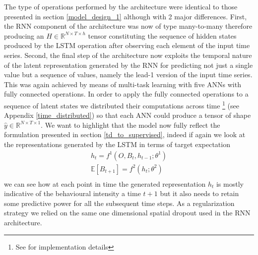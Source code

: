 The type of operations performed by the architecture were identical to those presented in section \ref{model_design_1} although with 2 major differences. First, the RNN component of the architecture was now of type many-to-many therefore producing an $H \in \mathbb{R}^{N \times T \times h}$ tensor constituting the sequence of hidden states produced by the LSTM operation after observing each element of the input time series\cite{bengio2017deep}. Second, the final step of the architecture now exploits the temporal nature of the latent representation generated by the RNN for predicting not just a single value but a sequence of values, namely the lead-1 version of the input time series. This was again achieved by means of multi-task learning with five ANNs with fully connected operations. In order to apply the fully connected operations to a sequence of latent states we distributed their computations across time \footnote{See \cite{chollet2015keras} for implementation details} (see Appendix \ref{time_distributed}) so that each ANN could produce a tensor of shape $\hat{y} \in \mathbb{R}^{N \times T \times 1}$. We want to highlight that the model now fully reflect the formulation presented in section \ref{td_to_supervised}, indeed if again we look at the representations generated by the LSTM in terms of target expectation
\begin{gather}
\label{rnn_1_exp}
   h_t = f^1(O, B_{t}, h_{t-1}; \theta^1)  \\ \nonumber
   \mathbb{E}[B_{t+1}] = f^2(h_t; \theta^2) \\ \nonumber    
\end{gather}
we can see how at each point in time the generated representation $h_t$ is mostly indicative of the behavioural intensity a time $t+1$ but it also needs to retain some predictive power for all the subsequent time steps. As a regularization strategy we relied on the same one dimensional spatial dropout used in the RNN architecture.

